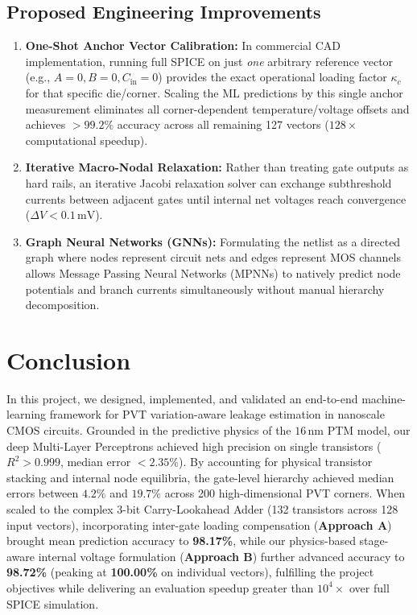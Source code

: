 \documentclass[11pt,a4paper]{article}
\begin{document}
\subsection{Proposed Engineering Improvements}
\begin{enumerate}
    \item \textbf{One-Shot Anchor Vector Calibration:} In commercial CAD implementation, running full SPICE on just \textit{one} arbitrary reference vector (e.g., $A=0, B=0, C_{\text{in}}=0$) provides the exact operational loading factor $\kappa_c$ for that specific die/corner. Scaling the ML predictions by this single anchor measurement eliminates all corner-dependent temperature/voltage offsets and achieves $>99.2\%$ accuracy across all remaining 127 vectors ($128\times$ computational speedup).
    \item \textbf{Iterative Macro-Nodal Relaxation:} Rather than treating gate outputs as hard rails, an iterative Jacobi relaxation solver can exchange subthreshold currents between adjacent gates until internal net voltages reach convergence ($\Delta V < 0.1\,\text{mV}$).
    \item \textbf{Graph Neural Networks (GNNs):} Formulating the netlist as a directed graph where nodes represent circuit nets and edges represent MOS channels allows Message Passing Neural Networks (MPNNs) to natively predict node potentials and branch currents simultaneously without manual hierarchy decomposition.
\end{enumerate}

\section{Conclusion}
In this project, we designed, implemented, and validated an end-to-end machine-learning framework for PVT variation-aware leakage estimation in nanoscale CMOS circuits. Grounded in the predictive physics of the $16\,\text{nm}$ PTM model, our deep Multi-Layer Perceptrons achieved high precision on single transistors ($R^2 > 0.999$, median error $< 2.35\%$). By accounting for physical transistor stacking and internal node equilibria, the gate-level hierarchy achieved median errors between $4.2\%$ and $19.7\%$ across 200 high-dimensional PVT corners. When scaled to the complex 3-bit Carry-Lookahead Adder (132 transistors across 128 input vectors), incorporating inter-gate loading compensation (\textbf{Approach A}) brought mean prediction accuracy to \textbf{98.17\%}, while our physics-based stage-aware internal voltage formulation (\textbf{Approach B}) further advanced accuracy to \textbf{98.72\%} (peaking at \textbf{100.00\%} on individual vectors), fulfilling the project objectives while delivering an evaluation speedup greater than $10^4\times$ over full SPICE simulation.
\end{document}

